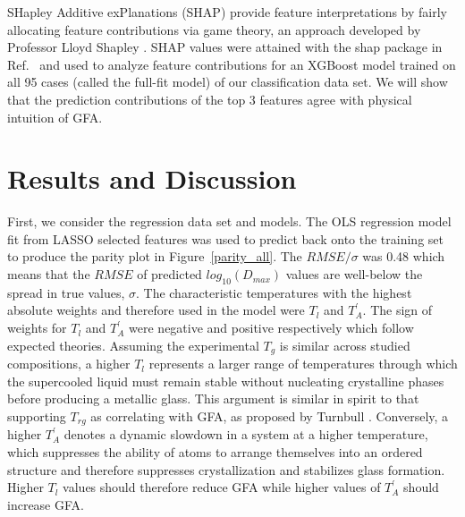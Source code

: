 \documentclass[11pt,a4paper]{article}                                %
\begin{document}
\par
SHapley Additive exPlanations (SHAP) provide feature interpretations by fairly allocating feature contributions via game theory, an approach developed by Professor Lloyd Shapley \cite{Strumbelj2014}. SHAP values were attained with the shap package in Ref.~\cite{shap} and used to analyze feature contributions for an XGBoost model trained on all 95 cases (called the full-fit model) of our classification data set. We will show that the prediction contributions of the top 3 features agree with physical intuition of GFA.

\section{Results and Discussion}

\par
First, we consider the regression data set and models. The OLS regression model fit from LASSO selected features was used to predict back onto the training set to produce the parity plot in Figure~\ref{parity_all}. The $RMSE/\sigma$ was 0.48 which means that the $RMSE$ of predicted $log_{10}(D_{max})$ values are well-below the spread in true values, $\sigma$. The characteristic temperatures with the highest absolute weights and therefore used in the model were $T_{l}$ and $T_{A}^{'}$. The sign of weights for $T_{l}$ and $T_{A}^{'}$ were negative and positive respectively which follow expected theories. Assuming the experimental $T_{g}$ is similar across studied compositions, a higher $T_{l}$ represents a larger range of temperatures through which the supercooled liquid must remain stable without nucleating crystalline phases before producing a metallic glass. This argument is similar in spirit to that supporting $T_{rg}$ as correlating with GFA, as proposed by Turnbull \cite{Turnbull1969}. Conversely, a higher $T_{A}^{'}$ denotes a dynamic slowdown in a system at a higher temperature, which suppresses the ability of atoms to arrange themselves into an ordered structure and therefore suppresses crystallization and stabilizes glass formation. Higher $T_{l}$ values should therefore reduce GFA while higher values of $T_{A}^{'}$ should increase GFA.
\end{document}
